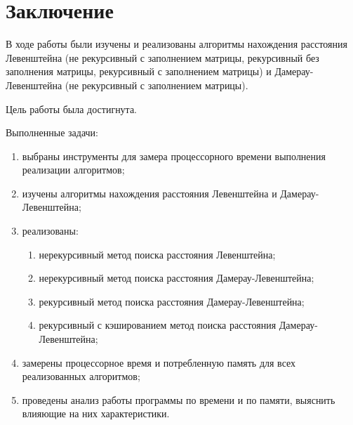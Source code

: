 \section*{\large Заключение}
    В ходе работы были изучены и реализованы алгоритмы нахождения
    расстояния Левенштейна (не рекурсивный с заполнением матрицы,
    рекурсивный без заполнения матрицы, рекурсивный с заполнением матрицы)
    и Дамерау-Левенштейна (не рекурсивный с заполнением матрицы). 
    
    
    \par Цель работы была достигнута.
\par Выполненные задачи:
	\begin{enumerate}
		\item выбраны инструменты для замера процессорного времени выполнения реализации алгоритмов;
		\item изучены алгоритмы нахождения расстояния Левенштейна и Дамерау-Левенштейна;
		\item реализованы:
		\begin{enumerate}
			\item нерекурсивный метод поиска расстояния Левенштейна;
			\item нерекурсивный метод поиска расстояния Дамерау-Левенштейна;
			\item рекурсивный метод поиска расстояния Дамерау-Левенштейна;
			\item рекурсивный с кэшированием метод поиска расстояния Дамерау-Левенштейна;
		\end{enumerate}
		\item замерены процессорное время и потребленную память для всех реализованных алгоритмов;
		\item проведены анализ работы программы по времени и по памяти, выяснить влияющие на них характеристики.
	\end{enumerate}
\newpage
